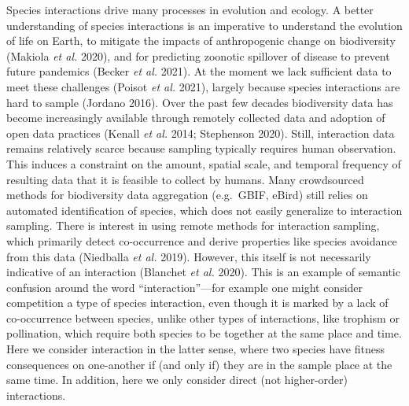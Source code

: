 \documentclass[10pt,oneside]{article}
\begin{document}
Species interactions drive many processes in evolution and ecology. A
better understanding of species interactions is an imperative to
understand the evolution of life on Earth, to mitigate the impacts of
anthropogenic change on biodiversity (Makiola \emph{et al.} 2020), and
for predicting zoonotic spillover of disease to prevent future pandemics
(Becker \emph{et al.} 2021). At the moment we lack sufficient data to
meet these challenges (Poisot \emph{et al.} 2021), largely because
species interactions are hard to sample (Jordano 2016). Over the past
few decades biodiversity data has become increasingly available through
remotely collected data and adoption of open data practices (Kenall
\emph{et al.} 2014; Stephenson 2020). Still, interaction data remains
relatively scarce because sampling typically requires human observation.
This induces a constraint on the amount, spatial scale, and temporal
frequency of resulting data that it is feasible to collect by humans.
Many crowdsourced methods for biodiversity data aggregation (e.g.~GBIF,
eBird) still relies on automated identification of species, which does
not easily generalize to interaction sampling. There is interest in
using remote methods for interaction sampling, which primarily detect
co-occurrence and derive properties like species avoidance from this
data (Niedballa \emph{et al.} 2019). However, this itself is not
necessarily indicative of an interaction (Blanchet \emph{et al.} 2020).
This is an example of semantic confusion around the word
``interaction''---for example one might consider competition a type of
species interaction, even though it is marked by a lack of co-occurrence
between species, unlike other types of interactions, like trophism or
pollination, which require both species to be together at the same place
and time. Here we consider interaction in the latter sense, where two
species have fitness consequences on one-another if (and only if) they
are in the sample place at the same time. In addition, here we only
consider direct (not higher-order) interactions.
\end{document}
